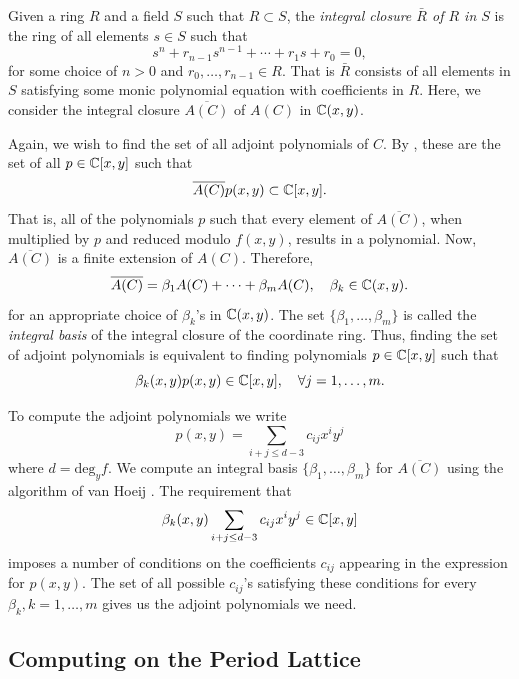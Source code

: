 Given a ring $R$ and a field $S$ such that $R \subset S$, the {\it integral
  closure $\bar{R}$ of $R$ in $S$} is the ring of all elements $s \in S$ such
that
\[
  s^n + r_{n-1}s^{n-1} + \cdots + r_1 s + r_0 = 0,
\]
for some choice of $n >0$ and $r_0,\ldots,r_{n-1} \in R$. That is $\bar{R}$
consists of all elements in $S$ satisfying some monic polynomial equation with
coefficients in $R$. Here, we consider the integral closure $\overline{A(C)}$ of
$A(C)$ in $\operatorname{\mathbb{C}}(x,y)$.

Again, we wish to find the set of all adjoint polynomials of $C$. By
\cite{Mnuk97}, these are the set of all $p \in \operatorname{\mathbb{C}}[x,y]$ such that
\[
  \overline{A(C)} p(x,y) \subset\operatorname{\mathbb{C}}[x,y].
\]
That is, all of the polynomials $p$ such that every element of
$\overline{A(C)}$, when multiplied by $p$ and reduced modulo $f(x,y)$, results
in a polynomial. Now, $\overline{A(C)}$ is a finite extension of $A(C)$.
Therefore,
\[
  \overline{A(C)} = \beta_1 A(C) + \cdots + \beta_m A(C), \quad \beta_k \in
  \operatorname{\mathbb{C}}(x,y).
\]
for an appropriate choice of $\beta_k$'s in $\operatorname{\mathbb{C}}(x,y)$. The set
$\{\beta_1,\ldots,\beta_m\}$ is called the {\it integral basis} of the integral
closure of the coordinate ring. Thus, finding the set of adjoint polynomials is
equivalent to finding polynomials $p \in \operatorname{\mathbb{C}}[x,y]$ such that
\[
  \beta_k(x,y) p(x,y) \in \operatorname{\mathbb{C}}[x,y], \quad \forall j=1,\ldots,m.
\]

To compute the adjoint polynomials we write
\[
  p(x,y) = \sum_{i+j \leq d-3} c_{ij}x^iy^j
\]
where $d = \text{deg}_y f$. We compute an integral basis
$\{\beta_1,\ldots,\beta_m\}$ for $\overline{A(C)}$ using the algorithm of van
Hoeij \cite{vanHoeij94}. The requirement that
\[
  \beta_k(x,y) \sum_{i+j \leq d-3} c_{ij}x^iy^j \in \operatorname{\mathbb{C}}[x,y]
\]
imposes a number of conditions on the coefficients $c_{ij}$ appearing in the
expression for $p(x,y)$. The set of all possible $c_{ij}$'s satisfying these
conditions for every $\beta_k, k=1,\ldots,m$ gives us the adjoint polynomials we
need.


\subsection{Computing on the Period
  Lattice}\label{subsec:abelfunctions-period-lattice}

